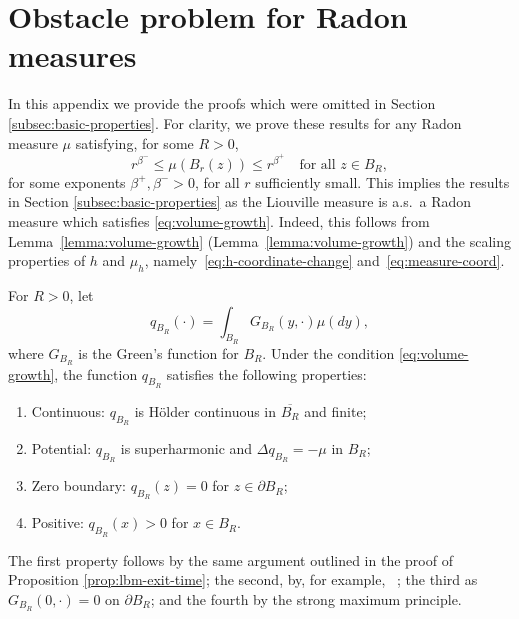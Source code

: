 \documentclass[12pt]{amsart}
\numberwithin{equation}{section}
\begin{document}
	\appendix
	\section{Obstacle problem for Radon measures} \label{sec:obstacle-appendix}
	
	In this appendix we provide the proofs which were omitted in Section \ref{subsec:basic-properties}. 
	For clarity, we prove these results for any Radon measure $\mu$ satisfying, for some $R > 0$,
	\begin{equation} \label{eq:volume-growth}
	r^{\beta^-} \leq \mu(B_r(z)) \leq r^{\beta^+} \quad \mbox{for all $z \in B_R$},
	\end{equation}
	for some exponents $\beta^+, \beta^- > 0$, for all $r$ sufficiently small. This implies the results in Section \ref{subsec:basic-properties} as the Liouville measure is a.s.\ a Radon measure which satisfies \eqref{eq:volume-growth}. Indeed, this follows from Lemma~\ref{lemma:volume-growth} (Lemma~\ref{lemma:volume-growth}) and the scaling properties of $h$ and $\mu_h$, namely~\eqref{eq:h-coordinate-change} and~\eqref{eq:measure-coord}.
	
	For $R > 0$, let 
	\begin{equation} \label{eq:expected-exit-time}
	q_{B_R}(\cdot) = \int_{B_R} G_{B_R}(y,\cdot) \mu(dy),
	\end{equation} 
	where $G_{B_R}$ is the Green's function for $B_R$. 
	Under the condition \eqref{eq:volume-growth}, the function $q_{B_R}$ satisfies the following properties: 
	\begin{enumerate}
		\item Continuous: $q_{B_R}$ is H\"{o}lder continuous in $\overline{B_R}$ and finite;
		\item Potential: $q_{B_R}$ is superharmonic and $\Delta q_{B_R} = -\mu$  in $B_R$;
		\item Zero boundary: $q_{B_R}(z) = 0$ for $z \in \partial B_R$;
		\item Positive: $q_{B_R}(x) > 0$ for $x \in B_R$.
	\end{enumerate}
	The first property follows by the same argument outlined in the proof of Proposition \ref{prop:lbm-exit-time}; 
	the second, by, for example, ~\cite[Theorem 4.3.8]{armitage2000classical}; the third as $G_{B_R}(0, \cdot) = 0$ on $\partial B_R$;
	and the fourth by the strong maximum principle. 
	
\end{document}
